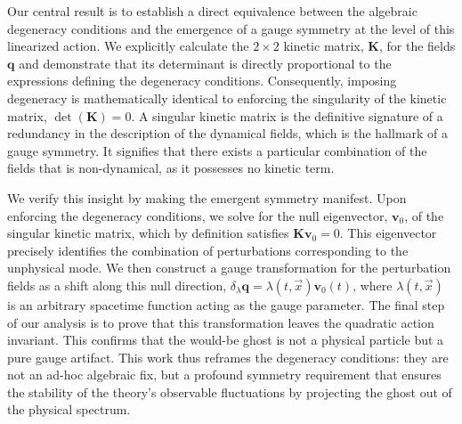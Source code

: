 \documentclass[twocolumn]{aastex631}
\begin{document}
Our central result is to establish a direct equivalence between the algebraic degeneracy conditions and the emergence of a gauge symmetry at the level of this linearized action. We explicitly calculate the $2 \times 2$ kinetic matrix, $\mathbf{K}$, for the fields $\mathbf{q}$ and demonstrate that its determinant is directly proportional to the expressions defining the degeneracy conditions. Consequently, imposing degeneracy is mathematically identical to enforcing the singularity of the kinetic matrix, $\det(\mathbf{K}) = 0$. A singular kinetic matrix is the definitive signature of a redundancy in the description of the dynamical fields, which is the hallmark of a gauge symmetry. It signifies that there exists a particular combination of the fields that is non-dynamical, as it possesses no kinetic term.

We verify this insight by making the emergent symmetry manifest. Upon enforcing the degeneracy conditions, we solve for the null eigenvector, $\mathbf{v}_0$, of the singular kinetic matrix, which by definition satisfies $\mathbf{K}\mathbf{v}_0 = 0$. This eigenvector precisely identifies the combination of perturbations corresponding to the unphysical mode. We then construct a gauge transformation for the perturbation fields as a shift along this null direction, $\delta_\lambda \mathbf{q} = \lambda(t, \vec{x}) \mathbf{v}_0(t)$, where $\lambda(t, \vec{x})$ is an arbitrary spacetime function acting as the gauge parameter. The final step of our analysis is to prove that this transformation leaves the quadratic action invariant. This confirms that the would-be ghost is not a physical particle but a pure gauge artifact. This work thus reframes the degeneracy conditions: they are not an ad-hoc algebraic fix, but a profound symmetry requirement that ensures the stability of the theory's observable fluctuations by projecting the ghost out of the physical spectrum.
\end{document}
